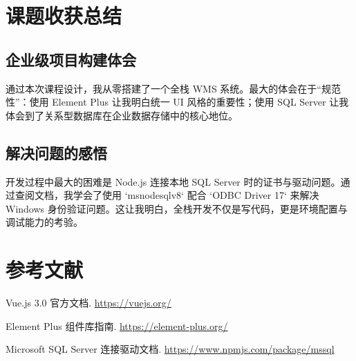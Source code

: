 \documentclass[UTF8, a4paper, 12pt]{ctexart}
\begin{document}
\section{课题收获总结}

\subsection{企业级项目构建体会}
通过本次课程设计，我从零搭建了一个全栈 WMS 系统。最大的体会在于“规范性”：使用 Element Plus 让我明白统一 UI 风格的重要性；使用 SQL Server 让我体会到了关系型数据库在企业数据存储中的核心地位。

\subsection{解决问题的感悟}
开发过程中最大的困难是 Node.js 连接本地 SQL Server 时的证书与驱动问题。通过查阅文档，我学会了使用 `msnodesqlv8` 配合 `ODBC Driver 17` 来解决 Windows 身份验证问题。这让我明白，全栈开发不仅是写代码，更是环境配置与调试能力的考验。

\section{参考文献}
\begin{enumerate}[label={[\arabic*]}]
    \item Vue.js 3.0 官方文档. \url{https://vuejs.org/}
    \item Element Plus 组件库指南. \url{https://element-plus.org/}
    \item Microsoft SQL Server 连接驱动文档. \url{https://www.npmjs.com/package/mssql}
\end{enumerate}
\end{document}
